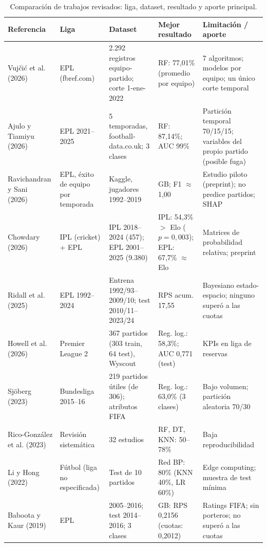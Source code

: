 \documentclass[12pt,letterpaper,oneside]{report}
\begin{document}
\begin{table}[!htbp]
\caption[Comparación de trabajos revisados: liga, dataset, resultado y aporte principal]{Comparación de trabajos revisados: liga, dataset, resultado y aporte principal.}
\label{tab:literatura}
\setlength{\tabcolsep}{2pt}
\footnotesize
\begin{tabular}{@{}p{3.2cm}p{2.2cm}p{3.4cm}p{2.6cm}p{4.6cm}@{}}
\toprule
\textbf{Referencia} & \textbf{Liga} & \textbf{Dataset} & \textbf{Mejor resultado} & \textbf{Limitación / aporte} \\
\midrule
Vujčić et al. (2026)~\cite{vujcic2026supervised} & EPL (fbref.com) & 2.292 registros equipo-partido; corte 1-ene-2022 & RF: 77,01\% (promedio por equipo) & 7 algoritmos; modelos por equipo; un único corte temporal \\
Ajulo y Tiamiyu (2026)~\cite{ajulo2026ml} & EPL 2021--2025 & 5 temporadas, football-data.co.uk; 3 clases & RF: 87,14\%; AUC 99\% & Partición temporal 70/15/15; variables del propio partido (posible fuga) \\
Ravichandran y Sani (2026)~\cite{ravichandran2026framework} & EPL, éxito de equipo por temporada & Kaggle, jugadores 1992--2019 & GB; F1 $\approx$ 1,00 & Estudio piloto (preprint); no predice partidos; SHAP \\
Chowdary (2026)~\cite{chowdary2026dynamic} & IPL (cricket) + EPL & IPL 2018--2024 (457); EPL 2001--2025 (9.380) & IPL: 54,3\% $>$ Elo ($p=0{,}003$); EPL: 67,7\% $\approx$ Elo & Matrices de probabilidad relativa; preprint \\
Ridall et al. (2025)~\cite{ridall2025bayesian} & EPL 1992--2024 & Entrena 1992/93--2009/10; test 2010/11--2023/24 & RPS acum. 17,55 & Bayesiano estado-espacio; ninguno superó a las cuotas \\
Howell et al. (2026)~\cite{howell2026winning} & Premier League 2 & 367 partidos (303 train, 64 test), Wyscout & Reg. log.: 58,3\%; AUC 0,771 (test) & KPIs en liga de reservas \\
Sjöberg (2023)~\cite{sjoborg2023football} & Bundesliga 2015--16 & 219 partidos útiles (de 306); atributos FIFA & Reg. log.: 63,0\% (3 clases) & Bajo volumen; partición aleatoria 70/30 \\
Rico-González et al. (2023)~\cite{ricogonzalez2023ml} & Revisión sistemática & 32 estudios & RF, DT, KNN: 50--78\% & Baja reproducibilidad \\
Li y Hong (2022)~\cite{li2022football} & Fútbol (liga no especificada) & Test de 10 partidos & Red BP: 80\% (KNN 40\%, LR 60\%) & Edge computing; muestra de test mínima \\
Baboota y Kaur (2019)~\cite{baboota2019predictive} & EPL & 2005--2016; test 2014--2016; 3 clases & GB: RPS 0,2156 (cuotas: 0,2012) & Ratings FIFA; sin porteros; no superó a las cuotas \\
\bottomrule
\end{tabular}
\par{}
\end{table}
\end{document}
